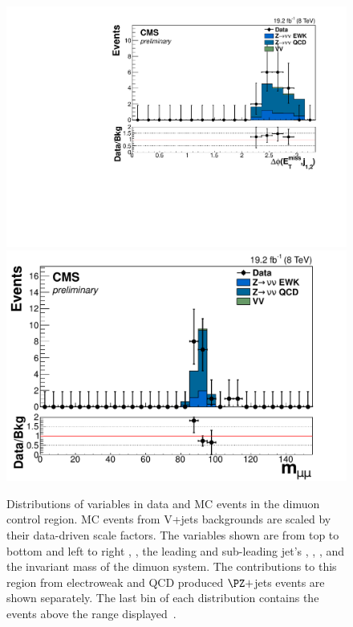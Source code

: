 \begin{figure}
  \includegraphics[width=.65\largefigwidth]{plots/parked/HIG-14-038-figs/output_sigreg/mumu_jetmetnomu_mindphi.pdf}
  \includegraphics[width=.65\largefigwidth]{plots/parked/HIG-14-038-figs/output_sigreg/mumu_m_mumu.pdf}
  \caption{Distributions of variables in data and \ac{MC} events in the dimuon control region. \ac{MC} events from V+jets backgrounds are scaled by their data-driven scale factors. The variables shown are from top to bottom and left to right \detajj, \Mjj, the leading and sub-leading jet's \pt, \METnoMU, \METsig, \jetmetdphileading and the invariant mass of the dimuon system. The contributions to this region from electroweak and \ac{QCD} produced $\PZ+$jets events are shown separately. The last bin of each distribution contains the events above the range displayed~\cite{CMS-PAS-HIG-14-038}.}
  \label{fig:parkedznunu}
\end{figure}

